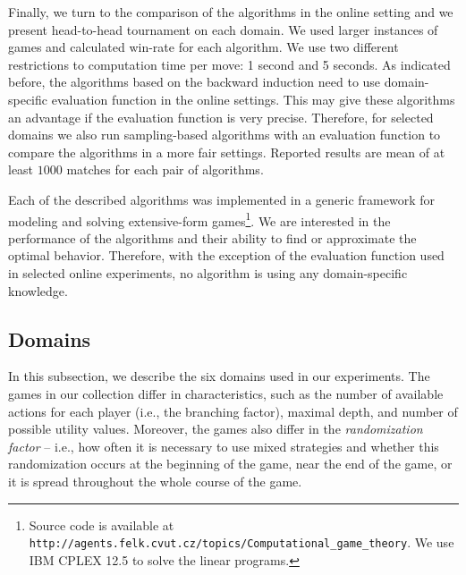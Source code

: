 Finally, we turn to the comparison of the algorithms in the online setting and we present head-to-head tournament on each domain.
We used larger instances of games and calculated win-rate for each algorithm.
We use two different restrictions to computation time per move: 1 second and 5 seconds.
As indicated before, the algorithms based on the backward induction need to use domain-specific evaluation function in the online settings.
This may give these algorithms an advantage if the evaluation function is very precise.
Therefore, for selected domains we also run sampling-based algorithms with an evaluation function to compare the algorithms in a more fair settings.
Reported results are mean of at least $1000$ matches for each pair of algorithms.

Each of the described algorithms was implemented in a generic framework for modeling and solving extensive-form games\footnote{Source code is available at \texttt{http://agents.felk.cvut.cz/topics/Computational\_\newline game\_theory}. We use IBM CPLEX 12.5 to solve the linear programs.}.
We are interested in the performance of the algorithms and their ability to find or approximate the optimal behavior.
Therefore, with the exception of the evaluation function used in selected online experiments, no algorithm is using any domain-specific knowledge.


\subsection{Domains}\label{sec:eval:domains}

In this subsection, we describe the six domains used in our experiments.
The games in our collection differ in characteristics, such as the number of available actions for each player (i.e., the branching factor), maximal depth, and number of possible utility values.
Moreover, the games also differ in the \emph{randomization factor} -- i.e., how often it is necessary to use mixed strategies and whether this randomization occurs at the beginning of the game, near the end of the game, or it is spread throughout the whole course of the game.

